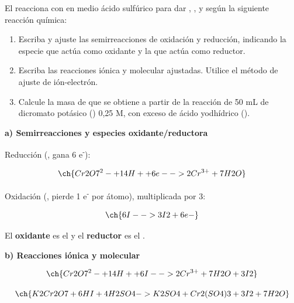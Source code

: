 \begin{exerciseEVAU}
    
El  reacciona con  en medio ácido sulfúrico para dar , ,  y  según la siguiente reacción química:
    

    \begin{enumerate}[label=\letraminuscula]
        \item Escriba y ajuste las semirreacciones de oxidación y reducción, indicando la
especie que actúa como oxidante y la que actúa como reductor.
        \item  Escriba las reacciones iónica y molecular ajustadas. Utilice el método de ajuste de ión-electrón.
        \item Calcule la masa de  que se obtiene a partir de la reacción de 50 mL de dicromato potásico () 0,25 M, con exceso de ácido yodhídrico ().
    \end{enumerate}

    \begin{solu}

        \textbf{a) Semirreacciones y especies oxidante/reductora}

        Reducción (, gana 6 e\textsuperscript{-}):

        \begin{equation*}
            \ch{Cr2O7^2- + 14 H+ + 6 e- -> 2 Cr^{3+} + 7 H2O}
        \end{equation*}

        Oxidación (, pierde 1 e\textsuperscript{-} por átomo), multiplicada por 3:

        \begin{equation*}
            \ch{6 I- -> 3 I2 + 6 e-}
        \end{equation*}

        El \textbf{oxidante} es el  y el \textbf{reductor} es el .

        \textbf{b) Reacciones iónica y molecular}

        \begin{equation*}
            \ch{Cr2O7^2- + 14 H+ + 6 I- -> 2 Cr^{3+} + 7 H2O + 3 I2}
        \end{equation*}

        \begin{equation*}
            \ch{K2Cr2O7 + 6 HI + 4 H2SO4 -> K2SO4 + Cr2(SO4)3 + 3 I2 + 7 H2O}
        \end{equation*}


\end{solu}
\end{exerciseEVAU}
